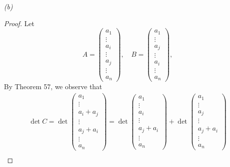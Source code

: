 \documentclass[12pt, a4paper]{article}
\begin{document}
\newpage
\textit{(b)}
\begin{proof}
    Let
    \[
        A = \begin{pmatrix}
            a_1\\ \vdots\\
            a_i\\ \vdots\\
            a_j\\ \vdots\\
            a_n
        \end{pmatrix}, \quad
        B = \begin{pmatrix}
            a_1\\ \vdots\\
            a_j\\ \vdots\\
            a_i\\ \vdots\\
            a_n
        \end{pmatrix},
    \]
    By Theorem 57, we observe that
    \begin{gather*}
        \det C = \det \begin{pmatrix}
            a_1\\ \vdots\\
            a_i + a_j\\ \vdots\\
            a_j + a_i\\ \vdots\\
            a_n
        \end{pmatrix} =
        \det \begin{pmatrix}
            a_1\\ \vdots\\
            a_i\\ \vdots\\
            a_j + a_i\\ \vdots\\
            a_n
        \end{pmatrix} +
        \det \begin{pmatrix}
            a_1\\ \vdots\\
            a_j\\ \vdots\\
            a_j + a_i\\ \vdots\\
            a_n
        \end{pmatrix}\\

\end{gather*}
\end{proof}
\end{document}
